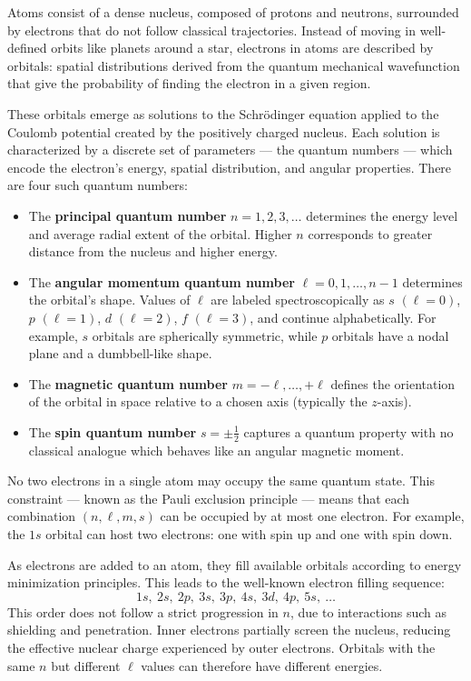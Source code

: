 Atoms consist of a dense nucleus, composed of protons and neutrons, surrounded by electrons that do not follow classical trajectories. Instead of moving in well-defined orbits like planets around a star, electrons in atoms are described by orbitals: spatial distributions derived from the quantum mechanical wavefunction that give the probability of finding the electron in a given region.

These orbitals emerge as solutions to the Schrödinger equation applied to the Coulomb potential created by the positively charged nucleus. Each solution is characterized by a discrete set of parameters — the quantum numbers — which encode the electron's energy, spatial distribution, and angular properties. There are four such quantum numbers:

\begin{itemize}[leftmargin=*]
  \item The \textbf{principal quantum number} $n = 1, 2, 3, \ldots$ determines the energy level and average radial extent of the orbital. Higher $n$ corresponds to greater distance from the nucleus and higher energy.
  \item The \textbf{angular momentum quantum number} $\ell = 0, 1, \ldots, n-1$ determines the orbital's shape. Values of $\ell$ are labeled spectroscopically as $s$ $(\ell=0)$, $p$ $(\ell=1)$, $d$ $(\ell=2)$, $f$ $(\ell=3)$, and continue alphabetically. For example, $s$ orbitals are spherically symmetric, while $p$ orbitals have a nodal plane and a dumbbell-like shape.
  \item The \textbf{magnetic quantum number} $m = -\ell, \ldots, +\ell$ defines the orientation of the orbital in space relative to a chosen axis (typically the $z$-axis).
  \item The \textbf{spin quantum number} $s = \pm \tfrac{1}{2}$ captures a quantum property with no classical analogue which behaves like an angular magnetic moment.
\end{itemize}

No two electrons in a single atom may occupy the same quantum state. This constraint — known as the Pauli exclusion principle — means that each combination $(n, \ell, m, s)$ can be occupied by at most one electron. For example, the $1s$ orbital can host two electrons: one with spin up and one with spin down.

\medskip

As electrons are added to an atom, they fill available orbitals according to energy minimization principles. This leads to the well-known electron filling sequence:
\[
1s,\ 2s,\ 2p,\ 3s,\ 3p,\ 4s,\ 3d,\ 4p,\ 5s,\ \ldots
\]
This order does not follow a strict progression in $n$, due to interactions such as shielding and penetration. Inner electrons partially screen the nucleus, reducing the effective nuclear charge experienced by outer electrons. Orbitals with the same $n$ but different $\ell$ values can therefore have different energies.

